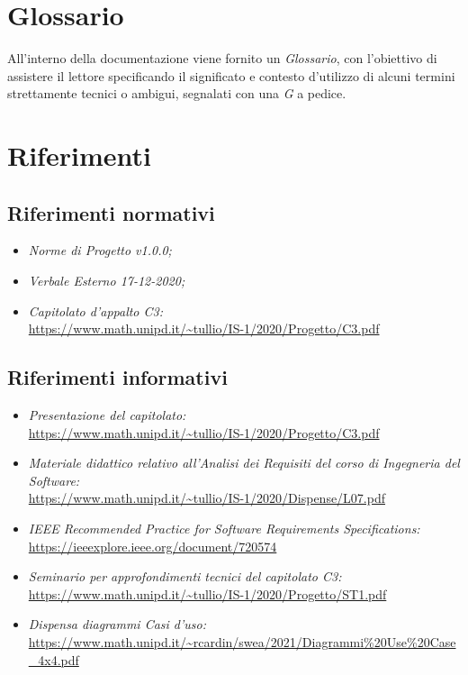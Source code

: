 \section{Glossario}\label{introduzioneGlossario}
All'interno della documentazione viene fornito un \textit{Glossario}, con l'obiettivo di assistere il lettore specificando il significato e contesto d'utilizzo di alcuni termini strettamente tecnici o ambigui, segnalati con una \textit{G} a pedice.

\section{Riferimenti}\label{introduzioneRiferimenti}
\subsection{Riferimenti normativi}\label{introduzioneRiferimentiNormativi}
\begin{itemize}
	\item \textit{Norme di Progetto v1.0.0;}
		\item \textit{Verbale Esterno 17-12-2020;}
		\item \textit{Capitolato d'appalto C3:} \\ \url{https://www.math.unipd.it/~tullio/IS-1/2020/Progetto/C3.pdf}
\end{itemize}
\subsection{Riferimenti informativi}\label{introduzioneRiferimentiInformativi}
\begin{itemize}
	\item \textit{Presentazione del capitolato:} \\ \url{https://www.math.unipd.it/~tullio/IS-1/2020/Progetto/C3.pdf}
		\item \textit{Materiale didattico relativo all'Analisi dei Requisiti del corso di Ingegneria del Software:}\\ \url{https://www.math.unipd.it/~tullio/IS-1/2020/Dispense/L07.pdf}
	\item \textit{IEEE Recommended Practice for Software Requirements Specifications:}\\
		\url{https://ieeexplore.ieee.org/document/720574}
	\item \textit{Seminario per approfondimenti tecnici del capitolato C3:}\\
		\url{https://www.math.unipd.it/~tullio/IS-1/2020/Progetto/ST1.pdf}
	\item \textit{Dispensa diagrammi Casi d'uso:}\\
		\url{https://www.math.unipd.it/~rcardin/swea/2021/Diagrammi\%20Use\%20Case_4x4.pdf}
\end{itemize}
